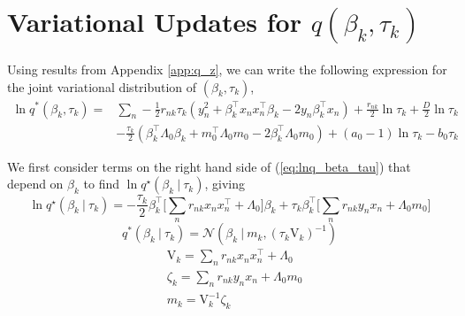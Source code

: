 \documentclass[twoside,11pt]{article}
\newcommand\given[1][]{\:#1\vert\:}
\newcommand{\transpose}[1]{#1^{\intercal}}
\begin{document}
\section{Variational Updates for $q(\beta_k, \tau_k)$} \label{app:beta_tau}  
Using results from Appendix \ref{app:q_z}, we can write the following expression for the joint variational distribution of $(\beta_k, \tau_k)$, 
\begin{equation} \label{eq:lnq_beta_tau}
\begin{split}
	\ln q^{*}(\beta_k, \tau_k) = & \sum_{n} -\frac{1}{2} r_{nk} \tau_k \left( y_n^2 + \transpose{\beta_k} x_n \transpose{x_n} \beta_k - 2y_n \transpose{\beta_k} x_n \right) + \frac{r_{nk}}{2} \ln \tau_k + \frac{D}{2} \ln \tau_k \\
	& - \frac{\tau_k}{2} \left( \transpose{\beta_k} \Lambda_0 \beta_k + \transpose{m_0} \Lambda_0 m_0 - 2\transpose{\beta_k}\Lambda_0m_0\right) + (a_0 - 1) \ln \tau_k - b_0 \tau_k
\end{split}
\end{equation}

We first consider terms on the right hand side of (\ref{eq:lnq_beta_tau}) that depend on $\beta_k$ to find $\ln q^{\star}(\beta_k \given \tau_k)$, giving
\begin{equation} \label{eq:lnq_beta}
	\ln q^{\star}(\beta_k \given \tau_k) = -\frac{\tau_k}{2} \transpose{\beta_k} \Big[ \sum_{n}r_{nk} x_n \transpose{x_n} + \Lambda_0 \Big] \beta_k + \tau_k \transpose{\beta_k} \Big[ \sum_{n} r_{nk}y_n x_n + \Lambda_0 m_0 \Big]
\end{equation}
\begin{equation} \label{q_beta}
	q^{*}(\beta_k \given \tau_k) = \mathcal{N}\left(\beta_k \given m_k, (\tau_k \mathrm{V}_k)^{-1} \right)
\end{equation}
\begin{equation} \label{eq:beta_params}
\begin{split}
    & \mathrm{V}_k = \sum_{n} r_{nk} x_n \transpose{x_n} + \Lambda_0 \\
 	& \zeta_k = \sum_{n} r_{nk} y_n x_n + \Lambda_0 m_0 \\
	& m_k = \mathrm{V}_k^{-1}  \zeta_k 
\end{split}
\end{equation}
\end{document}
